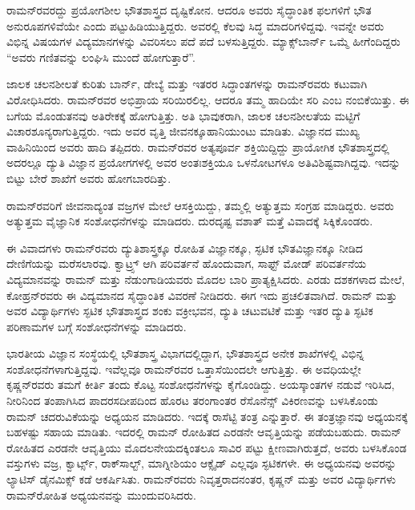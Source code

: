 ರಾಮನ್‍ರವರದ್ದು ಪ್ರಯೋಗಶೀಲ ಭೌತಶಾಸ್ತ್ರದ ದೃಷ್ಟಿಕೋನ. ಆದರೂ ಅವರು ಸೈದ್ಧಾಂತಿಕ ಫಲಗಳಿಗೆ ಭೌತ ಅನುರೂಪಗಳಿವೆಯೇ ಎಂದು ಪಟ್ಟುಹಿಡಿಯುತ್ತಿದ್ದರು. ಅವರಲ್ಲಿ ಕೆಲವು ಸಿದ್ಧ ಮಾದರಿಗಳಿದ್ದವು. ಇವನ್ನೇ ಅವರು ವಿಭಿನ್ನ ವಿಷಯಗಳ ವಿದ್ಯಮಾನಗಳನ್ನು ವಿವರಿಸಲು ಪದೆ ಪದೆ ಬಳಸುತ್ತಿದ್ದರು. ಮ್ಯಾಕ್ಸ್‌ಬಾರ್ನ್ ಒಮ್ಮೆ ಹೀಗೆಂದಿದ್ದರು “ಅವರು ಗಣಿತವನ್ನು ಲಂಘಿಸಿ ಮುಂದೆ ಹೋಗುತ್ತಾರೆ”.

ಜಾಲಕ ಚಲನಶೀಲತೆ ಕುರಿತು ಬಾರ್ನ್, ಡೇಬ್ಯೆ ಮತ್ತು ಇತರರ ಸಿದ್ಧಾಂತಗಳನ್ನು ರಾಮನ್‍ರವರು ಕಟುವಾಗಿ ವಿರೋಧಿಸಿದರು. ರಾಮನ್‍ರವರ ಅಭಿಪ್ರಾಯ ಸರಿಯಿರಲಿಲ್ಲ. ಆದರೂ ತಮ್ಮ ಹಾದಿಯೇ ಸರಿ ಎಂಬ ನಂಬಿಕೆಯಿತ್ತು. ಈ ಬಗೆಯ ಮೊಂಡುತನವು ಅತಿರೇಕಕ್ಕೆ ಹೋಗುತ್ತಿತ್ತು. ಅತಿ ಭಾವುಕರಾಗಿ, ಜಾಲಕ ಚಲನಶೀಲತೆಯ ಮಟ್ಟಿಗೆ ವಿಚಾರಶೂನ್ಯರಾಗುತ್ತಿದ್ದರು. ಇದು ಅವರ ವೃತ್ತಿ ಜೀವನಕ್ಕೂ\break ಹಾನಿಯುಂಟು ಮಾಡಿತು. ವಿಜ್ಞಾನದ ಮುಖ್ಯ ವಾಹಿನಿಯಿಂದ ಅವರು ಹಾದಿ ತಪ್ಪಿದರು. ರಾಮನ್‍ರವರ ಅತ್ಯಪೂರ್ವ ಶಕ್ತಿಯಿದ್ದಿದ್ದು ಪ್ರಾಯೋಗಿಕ ಭೌತಶಾಸ್ತ್ರದಲ್ಲಿ ಅದರಲ್ಲೂ ದ್ಯುತಿ ವಿಜ್ಞಾನ ಪ್ರಯೋಗಗಳಲ್ಲಿ ಅವರ ಅಂತಃಶಕ್ತಿಯೂ ಒಳನೋಟಗಳೂ ಅತಿವಿಶಿಷ್ಟವಾಗಿದ್ದವು. ಇದನ್ನು ಬಿಟ್ಟು ಬೇರೆ ಶಾಖೆಗೆ ಅವರು ಹೋಗಬಾರದಿತ್ತು.

ರಾಮನ್‍ರವರಿಗೆ ಜೀವನಾದ್ಯಂತ ವಜ್ರಗಳ ಮೇಲೆ ಆಸಕ್ತಿಯಿದ್ದು, ತಮ್ಮಲ್ಲಿ ಅತ್ಯುತ್ತಮ ಸಂಗ್ರಹ ಮಾಡಿದ್ದರು. ಅವರು ಅತ್ಯುತ್ತಮ ವೈಜ್ಞಾನಿಕ ಸಂಶೋಧನೆಗಳನ್ನು ಮಾಡಿದರು. ದುರದೃಷ್ಟ ವಶಾತ್ ಮತ್ತೆ ವಿವಾದಕ್ಕೆ ಸಿಕ್ಕಿಕೊಂಡರು.

ಈ ವಿವಾದಗಳು ರಾಮನ್‍ರವರು ದ್ಯುತಿಶಾಸ್ತ್ರಕ್ಕೂ ರೋಹಿತ ವಿಜ್ಞಾನಕ್ಕೂ, ಸ್ಫಟಿಕ ಭೌತವಿಜ್ಞಾನಕ್ಕೂ ನೀಡಿದ ದೇಣಿಗೆಯನ್ನು ಮರೆಸಲಾರವು. ಕ್ವಾಟ್ರ್ಸ್ ಆಗಿ ಪರಿವರ್ತನೆ ಹೊಂದುವಾಗ, ಸಾಫ್ಟ್ ಮೋಡ್ ಪರಿವರ್ತನೆಯ ವಿದ್ಯಮಾನವನ್ನು ರಾಮನ್ ಮತ್ತು ನೆಡುಂಗಾಡಿಯವರು ಮೊದಲ ಬಾರಿ ಪ್ರಾತ್ಯಕ್ಷಿಸಿದರು. ಎರಡು ದಶಕಗಳಾದ ಮೇಲೆ, ಕೋಹ್ರನ್‍ರವರು ಈ ವಿದ್ಯಮಾನದ ಸೈದ್ಧಾಂತಿಕ ವಿವರಣೆ ನೀಡಿದರು. ಈಗ ಇದು ಪ್ರಚಲಿತವಾಗಿದೆ. ರಾಮನ್ ಮತ್ತು ಅವರ ವಿದ್ಯಾರ್ಥಿಗಳು ಸ್ಫಟಿಕ ಭೌತಶಾಸ್ತ್ರದ ಶಂಕು ವಕ್ರೀಭವನ, ದ್ಯುತಿ ಚಟುವಟಿಕೆ ಮತ್ತು ಇತರ ದ್ಯುತಿ ಸ್ಫಟಿಕ ಪರಿಣಾಮಗಳ ಬಗ್ಗೆ ಸಂಶೋಧನೆಗಳನ್ನು ಮಾಡಿದರು.

ಭಾರತೀಯ ವಿಜ್ಞಾನ ಸಂಸ್ಥೆಯಲ್ಲಿ ಭೌತಶಾಸ್ತ್ರ ವಿಭಾಗದಲ್ಲಿದ್ದಾಗ, ಭೌತಶಾಸ್ತ್ರದ ಅನೇಕ ಶಾಖೆಗಳಲ್ಲಿ ವಿಭಿನ್ನ ಸಂಶೋಧನೆಗಳಾಗುತ್ತಿದ್ದವು. ಇವೆಲ್ಲವೂ ರಾಮನ್‍ರವರ ಒತ್ತಾಸೆಯಿಂದಲೇ ಆಗುತ್ತಿತ್ತು. ಈ ಅವಧಿಯಲ್ಲೇ ಕೃಷ್ಣನ್‍ರವರು ತಮಗೆ ಕೀರ್ತಿ ತಂದು ಕೊಟ್ಟ ಸಂಶೋಧನೆಗಳನ್ನು ಕೈಗೊಂಡಿದ್ದು. ಅಯಸ್ಕಾಂತಗಳ ನಡುವೆ ಇರಿಸಿದ, ನೀರಿನಿಂದ ತಂಪಾಗಿಸಿದ ಪಾದರಸದೀಪದಿಂದ ಹೊರಟ ತರಂಗಾಂತರ  ರೆಸೊನೆನ್ಸ್ ವಿಕಿರಣವನ್ನು ಬಳಸಿಕೊಂಡು ರಾಮನ್ ಚದರುವಿಕೆಯನ್ನು ಅಧ್ಯಯನ ಮಾಡಿದರು. ಇದಕ್ಕೆ ರಾಸೆಟ್ಟಿ ತಂತ್ರ ಎನ್ನುತ್ತಾರೆ. ಈ ತಂತ್ರಜ್ಞಾನವು ಅಧ್ಯಯನಕ್ಕೆ ಬಹಳಷ್ಟು ಸಹಾಯ ಮಾಡಿತು. ಇದರಲ್ಲಿ ರಾಮನ್ ರೋಹಿತದ  ಎರಡನೇ ಆವೃತ್ತಿಯನ್ನು ಪಡೆಯಬಹುದು. ರಾಮನ್ ರೋಹಿತದ  ಎರಡನೇ ಆವೃತ್ತಿಯು ಮೊದಲನೇಯದಕ್ಕಿಂತಲೂ ಸಾವಿರ ಪಟ್ಟು ಕ್ಷೀಣವಾಗಿರುತ್ತದೆ, ಅವರು ಬಳಸಿಕೊಂಡ ವಸ್ತುಗಳು ವಜ್ರ, ಕ್ವಾರ್ಟ್ಸ್, ರಾಕ್‍ಸಾಲ್ಟ್, ಮಾಗ್ನೀಶಿಯಂ ಆಕ್ಸೈಡ್\enginline{-} ಎಲ್ಲವೂ ಸ್ಫಟಿಕಗಳೇ. ಈ ಅಧ್ಯಯನವು ಅವರನ್ನು ಲ್ಯಾಟಿಸ್ ಡೈನಮಿಕ್ಸ್ ಕಡೆ ಆಕರ್ಷಿಸಿತು. ರಾಮನ್‍ರವರು ನಿವೃತ್ತರಾದನಂತರ, ಕೃಷ್ಣನ್ ಮತ್ತು ಅವರ ವಿದ್ಯಾರ್ಥಿಗಳು ರಾಮನ್‍ರೋಹಿತ ಅಧ್ಯಯನವನ್ನು ಮುಂದುವರಿಸಿದರು.


